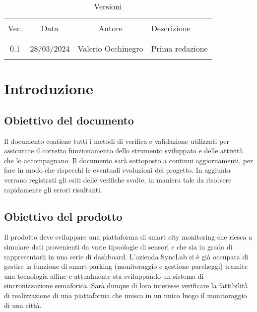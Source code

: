 \documentclass[italian,12pt]{article} %
\begin{document}


\newpage



\begin{table}[!h]
	\caption{Versioni}
	\begin{center}
		\begin{tabular}{ c c c p{9cm} }
			\hline                                                                                 \\[-2ex]
			Ver. & Data       & Autore             & Descrizione                                   \\
			\\[-2ex] \hline \\[-1.5ex]
			0.1  & 28/03/2024 & Valerio Occhinegro & Prima redazione          					   \\
			\\[-1.5ex] \hline
		\end{tabular}
	\end{center}
\end{table}

\newpage

\tableofcontents

\newpage

\section{Introduzione}

\subsection{Obiettivo del documento}
Il documento contiene tutti i metodi di verifica e validazione utilizzati
per assicurare il corretto funzionamento dello strumento sviluppato e delle
attività che lo accompagnano.
Il documento sarà sottoposto a continui aggiornamenti, per fare in modo che 
rispecchi le eventuali evoluzioni del progetto.
In aggiunta verrano registrati gli esiti delle verifiche svolte, in maniera tale 
da risolvere rapidamente gli errori risultanti.


\subsection{Obiettivo del prodotto}
Il prodotto deve sviluppare una piattaforma di smart city monitoring 
che riesca a simulare dati provenienti da varie tipoologie di sensori e che sia in grado di 
rappresentarli in una serie di dashboard.
L'azienda SyncLab si è già occupata di gestire la funzione di smart-parking (monitoraggio e gestione parcheggi) 
tramite una tecnologia affine e attualmente sta sviluppando un sistema di sincronizzazione semaforica.
Sarà dunque di loro interesse verificare la fattibilità di realizzazione di una piattaforma 
che unisca in un unico luogo il monitoraggio di una città.
\end{document}
